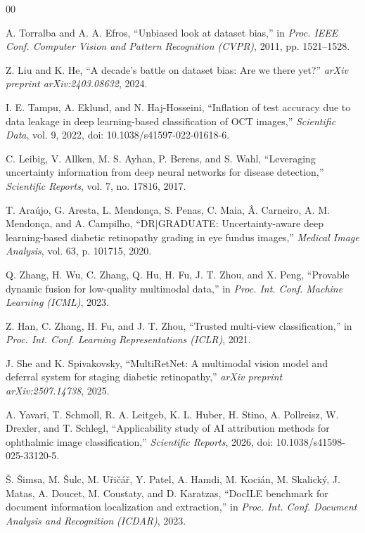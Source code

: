 \documentclass[conference]{IEEEtran}
\begin{document}
\begin{thebibliography}{00}

 A. Torralba and A. A. Efros, ``Unbiased look at
dataset bias,'' in \emph{Proc. IEEE Conf. Computer Vision and Pattern
Recognition (CVPR)}, 2011, pp. 1521--1528.

 Z. Liu and K. He, ``A decade's battle on dataset
bias: Are we there yet?'' \emph{arXiv preprint arXiv:2403.08632}, 2024.

 I. E. Tampu, A. Eklund, and N. Haj-Hosseini,
``Inflation of test accuracy due to data leakage in deep learning-based
classification of OCT images,'' \emph{Scientific Data}, vol. 9, 2022,
doi: 10.1038/s41597-022-01618-6.

 C. Leibig, V. Allken, M. S. Ayhan, P. Berens, and S.
Wahl, ``Leveraging uncertainty information from deep neural networks for
disease detection,'' \emph{Scientific Reports}, vol. 7, no. 17816, 2017.

 T. Ara\'ujo, G. Aresta, L. Mendon\c{c}a, S. Penas, C.
Maia, \^A. Carneiro, A. M. Mendon\c{c}a, and A. Campilho, ``DR$|$GRADUATE:
Uncertainty-aware deep learning-based diabetic retinopathy grading in eye
fundus images,'' \emph{Medical Image Analysis}, vol. 63, p. 101715, 2020.

 Q. Zhang, H. Wu, C. Zhang, Q. Hu, H. Fu, J. T. Zhou,
and X. Peng, ``Provable dynamic fusion for low-quality multimodal data,''
in \emph{Proc. Int. Conf. Machine Learning (ICML)}, 2023.

 Z. Han, C. Zhang, H. Fu, and J. T. Zhou, ``Trusted
multi-view classification,'' in \emph{Proc. Int. Conf. Learning
Representations (ICLR)}, 2021.

 J. She and K. Spivakovsky, ``MultiRetNet: A
multimodal vision model and deferral system for staging diabetic
retinopathy,'' \emph{arXiv preprint arXiv:2507.14738}, 2025.

 A. Yavari, T. Schmoll, R. A. Leitgeb, K. L. Huber, H.
Stino, A. Pollreisz, W. Drexler, and T. Schlegl, ``Applicability study of
AI attribution methods for ophthalmic image classification,'' \emph{Scientific
Reports}, 2026, doi: 10.1038/s41598-025-33120-5.

 \v{S}. \v{S}imsa, M. \v{S}ulc, M. U\v{r}i\v{c}\'a\v{r},
Y. Patel, A. Hamdi, M. Koci\'an, M. Skalick\'y, J. Matas, A. Doucet, M.
Coustaty, and D. Karatzas, ``DocILE benchmark for document information
localization and extraction,'' in \emph{Proc. Int. Conf. Document Analysis
and Recognition (ICDAR)}, 2023.

\end{thebibliography}
\end{document}
